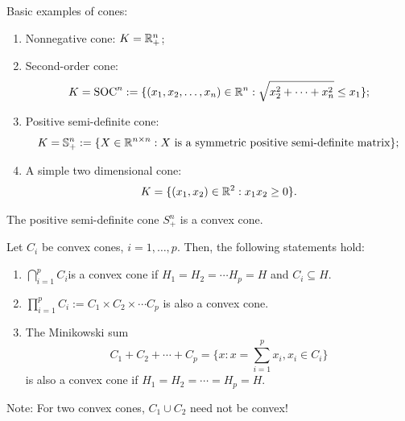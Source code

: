 Basic examples of cones:
\begin{enumerate}
    \item Nonnegative cone: \(K = \mathbb{R}_+^n\);
    \item Second-order cone:
          \[K = \text{SOC}^n := \{(x_1, x_2, \dots, x_n) \in \mathbb{R}^n : \sqrt{x_2^2 + \dots + x_n^2} \leq x_1\};\]
    \item Positive semi-definite cone:
          \[K = \mathbb{S}_+^n := \{X \in \mathbb{R}^{n \times n}: X \text{ is a symmetric positive semi-definite matrix}\};\]
    \item A simple two dimensional cone:
          \[K = \{(x_1, x_2) \in \mathbb{R}^2: x_1x_2 \geq 0\}.\]
\end{enumerate}



\begin{proposition}
    The positive semi-definite cone \(S_+^n\) is a convex cone.
\end{proposition}

\begin{theorem}
    Let \(C_i\) be convex cones, \(i = 1, \dots, p\). Then, the following statements hold:
    \begin{enumerate}
        \item \(\bigcap_{i = 1}^p C_i\)is a convex cone if \(H_1 = H_2 = \cdots H_p = H\) and \(C_i \subseteq H\).
        \item \(\prod_{i = 1}^p C_i := C_1 \times C_2 \times \cdots C_p\) is also a convex cone.
        \item The Minikowski sum
              \[C_1 + C_2 + \cdots + C_p = \{x : x = \sum_{i = 1}^p x_i, x_i \in C_i\}\]
              is also a convex cone if \(H_1 = H_2 = \cdots = H_p = H\).
    \end{enumerate}
\end{theorem}

Note: For two convex cones, \(C_1 \cup C_2\) need not be convex!


